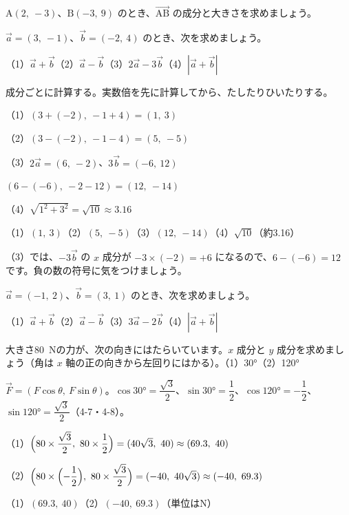 \begin{jibun}
$\mathrm{A}(2,\ -3)$、$\mathrm{B}(-3,\ 9)$ のとき、$\overrightarrow{\mathrm{AB}}$ の成分と大きさを求めましょう。
\end{jibun}

\begin{reidai}[成分で計算する]
$\vec{a}=(3,\ -1)$、$\vec{b}=(-2,\ 4)$ のとき、次を求めましょう。\par
（1）$\vec{a}+\vec{b}$\quad（2）$\vec{a}-\vec{b}$\quad（3）$2\vec{a}-3\vec{b}$\quad（4）$|\vec{a}+\vec{b}|$\par
\kangaekata 成分ごとに計算する。実数倍を先に計算してから、たしたりひいたりする。\par
\shiki（1）$(3+(-2),\ -1+4)=(1,\ 3)$\par
\hspace*{2.6\zw}（2）$(3-(-2),\ -1-4)=(5,\ -5)$\par
\hspace*{2.6\zw}（3）$2\vec{a}=(6,\ -2)$、$3\vec{b}=(-6,\ 12)$\par
\hspace*{4.6\zw}$(6-(-6),\ -2-12)=(12,\ -14)$\par
\hspace*{2.6\zw}（4）$\sqrt{1^2+3^2}=\sqrt{10}\approx3.16$\par
\kotae （1）$(1,\ 3)$\quad（2）$(5,\ -5)$\quad（3）$(12,\ -14)$\quad（4）$\sqrt{10}$（約3.16）
\end{reidai}
（3）では、$-3\vec{b}$ の $x$ 成分が $-3\times(-2)=+6$ になるので、$6-(-6)=12$ です。負の数の符号に気をつけましょう。

\begin{jibun}
$\vec{a}=(-1,\ 2)$、$\vec{b}=(3,\ 1)$ のとき、次を求めましょう。\par
（1）$\vec{a}+\vec{b}$\quad（2）$\vec{a}-\vec{b}$\quad（3）$3\vec{a}-2\vec{b}$\quad（4）$|\vec{a}+\vec{b}|$
\end{jibun}

\begin{reidai}[力を成分に分ける]
大きさ\qty{80}{N}の力が、次の向きにはたらいています。$x$ 成分と $y$ 成分を求めましょう（角は $x$ 軸の正の向きから左回りにはかる）。\quad（1）30°\quad（2）120°\par
\kangaekata $\vec{F}=(F\cos\theta,\ F\sin\theta)$。$\cos30°=\dfrac{\sqrt3}{2}$、$\sin30°=\dfrac{1}{2}$、$\cos120°=-\dfrac{1}{2}$、$\sin120°=\dfrac{\sqrt3}{2}$（4-7・4-8）。\par
\shiki（1）$\Bigl(80\times\dfrac{\sqrt3}{2},\ 80\times\dfrac{1}{2}\Bigr)=(40\sqrt3,\ 40)\approx(69.3,\ 40)$\par
\hspace*{2.6\zw}（2）$\Bigl(80\times\Bigl(-\dfrac{1}{2}\Bigr),\ 80\times\dfrac{\sqrt3}{2}\Bigr)=(-40,\ 40\sqrt3)\approx(-40,\ 69.3)$\par
\kotae （1）$(69.3,\ 40)$\quad（2）$(-40,\ 69.3)$（単位はN）
\end{reidai}

